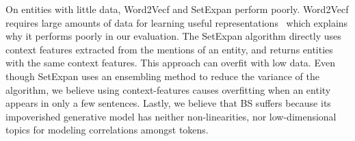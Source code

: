 \documentclass[a4paper]{article}
\newcommand{\wTv}{Word2Vecf\xspace}
\newcommand{\setX}{SetExpan\xspace}
\newcommand{\nvge}{NVSE\xspace}
\newcommand{\mycite}[1]{\cite{#1}}%
\begin{document}
On entities with little data, \wTv and \setX  perform poorly. \wTv %
requires large amounts of data for learning useful representations~\mycite{AltszylerSS16} which explains why it performs poorly in our evaluation. The \setX algorithm directly uses context features extracted from the mentions of an entity, and returns entities with the same context features.
This approach can overfit %
with low data. Even though \setX uses an ensembling method to reduce the variance of %
the algorithm, we believe %
using context-features causes overfitting when an entity appears in only a few sentences. 
Lastly, we believe that BS suffers because 
its impoverished generative model 
has neither non-linearities, nor low-dimensional topics for modeling correlations amongst tokens. %

\end{document}
